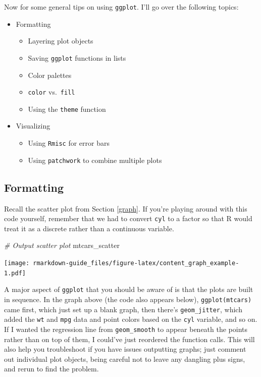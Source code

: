 \documentclass[
]{book}
\newenvironment{Shaded}{\begin{snugshade}}{\end{snugshade}}
\newcommand{\CommentTok}[1]{\textcolor[rgb]{0.56,0.35,0.01}{\textit{#1}}}
\newcommand{\NormalTok}[1]{#1}
\providecommand{\tightlist}{%
  \setlength{\itemsep}{0pt}\setlength{\parskip}{0pt}}
\begin{document}
Now for some general tips on using \texttt{ggplot}. I'll go over the following topics:

\begin{itemize}
\tightlist
\item
  Formatting

  \begin{itemize}
  \tightlist
  \item
    Layering plot objects
  \item
    Saving \texttt{ggplot} functions in lists
  \item
    Color palettes
  \item
    \texttt{color} vs.~\texttt{fill}
  \item
    Using the \texttt{theme} function
  \end{itemize}
\item
  Visualizing

  \begin{itemize}
  \tightlist
  \item
    Using \texttt{Rmisc} for error bars
  \item
    Using \texttt{patchwork} to combine multiple plots
  \end{itemize}
\end{itemize}

\hypertarget{formatting}{%
\subsection{Formatting}\label{formatting}}

Recall the scatter plot from Section \ref{graph}. If you're playing around with this code yourself, remember that we had to convert \texttt{cyl} to a factor so that R would treat it as a discrete rather than a continuous variable.

\begin{Shaded}
\begin{Highlighting}[]
\CommentTok{# Output scatter plot}
\NormalTok{mtcars_scatter}
\end{Highlighting}
\end{Shaded}

\texttt{[image: rmarkdown-guide\_files/figure-latex/content\_graph\_example-1.pdf]}

A major aspect of \texttt{ggplot} that you should be aware of is that the plots are built in sequence. In the graph above (the code also appears below), \texttt{ggplot(mtcars)} came first, which just set up a blank graph, then there's \texttt{geom\_jitter}, which added the \texttt{wt} and \texttt{mpg} data and point colors based on the \texttt{cyl} variable, and so on. If I wanted the regression line from \texttt{geom\_smooth} to appear beneath the points rather than on top of them, I could've just reordered the function calls. This will also help you troubleshoot if you have issues outputting graphs; just comment out individual plot objects, being careful not to leave any dangling plus signs, and rerun to find the problem.
\end{document}
